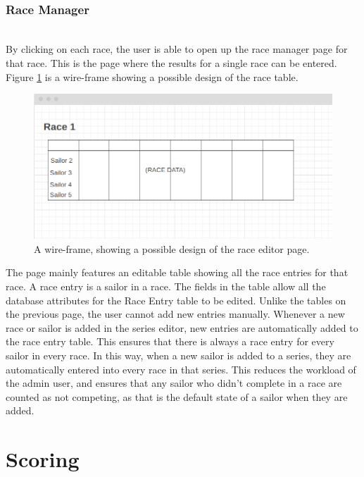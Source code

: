 \documentclass{l4proj}
\begin{document}
\hfill\\
\subsubsection{Race Manager}
\hfill\\
By clicking on each race, the user is able to open up the race manager page for that race. This is the page where the results for a single race can be entered. Figure \ref{fig:raceEditorWF} is a wire-frame showing a possible design of the race table.

\begin{figure}[H]
    \centering
    \includegraphics[width=1\linewidth]{images/Race editor.png} 

    \caption{A wire-frame, showing a possible design of the race editor page.
    }

    \label{fig:raceEditorWF}
\end{figure}

The page mainly features an editable table showing all the race entries for that race. A race entry is a sailor in a race. The fields in the table allow all the database attributes for the Race Entry table to be edited. Unlike the tables on the previous page, the user cannot add new entries manually. Whenever a new race or sailor is added in the series editor, new entries are automatically added to the race entry table. This ensures that there is always a race entry for every sailor in every race. In this way, when a new sailor is added to a series, they are automatically entered into every race in that series. This reduces the workload of the admin user, and ensures that any sailor who didn't complete in a race are counted as not competing, as that is the default state of a sailor when they are added.

\section{Scoring}
\end{document}
